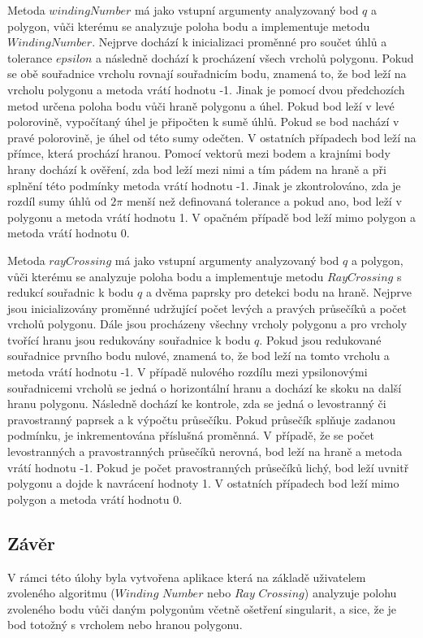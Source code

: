 \documentclass[15pt]{article}
\begin{document}
\begin{spacing}{1.5}
\noindent Metoda $windingNumber$ má jako vstupní argumenty analyzovaný bod $q$ a polygon, vůči kterému se analyzuje poloha bodu a implementuje metodu $Winding Number$. Nejprve dochází k inicializaci proměnné pro součet úhlů a tolerance $epsilon$ a následně dochází k procházení všech vrcholů polygonu. Pokud se obě souřadnice vrcholu rovnají souřadnicím bodu, znamená to, že bod leží na vrcholu polygonu a metoda vrátí hodnotu -1. Jinak je pomocí dvou předchozích metod určena poloha bodu vůči hraně polygonu a úhel. Pokud bod leží v levé polorovině, vypočítaný úhel je připočten k sumě úhlů. Pokud se bod nachází v pravé polorovině, je úhel od této sumy odečten. V ostatních případech bod leží na přímce, která prochází hranou. Pomocí vektorů mezi bodem a krajními body hrany dochází k ověření, zda bod leží mezi nimi a tím pádem na hraně a při splnění této podmínky metoda vrátí hodnotu -1. Jinak je zkontrolováno, zda je rozdíl sumy úhlů od $2\pi$ menší než definovaná tolerance a pokud ano, bod leží v polygonu a metoda vrátí hodnotu 1. V opačném případě bod leží mimo polygon a metoda vrátí hodnotu 0.

\noindent Metoda $rayCrossing$ má jako vstupní argumenty analyzovaný bod $q$ a polygon, vůči kterému se analyzuje poloha bodu a implementuje metodu $Ray Crossing$ s redukcí souřadnic k bodu $q$ a dvěma paprsky pro detekci bodu na hraně. Nejprve jsou inicializovány proměnné udržující počet levých a pravých průsečíků a počet vrcholů polygonu. Dále jsou procházeny všechny vrcholy polygonu a pro vrcholy tvořící hranu jsou redukovány souřadnice k bodu $q$. Pokud jsou redukované souřadnice prvního bodu nulové, znamená to, že bod leží na tomto vrcholu a metoda vrátí hodnotu -1. V případě nulového rozdílu mezi ypsilonovými souřadnicemi vrcholů se jedná o horizontální hranu a dochází ke skoku na další hranu polygonu. Následně dochází ke kontrole, zda se jedná o levostranný či pravostranný paprsek a k výpočtu průsečíku. Pokud průsečík splňuje zadanou podmínku, je inkrementována příslušná proměnná. V případě, že se počet levostranných a pravostranných průsečíků nerovná, bod leží na hraně a metoda vrátí hodnotu -1. Pokud je počet pravostranných průsečíků lichý, bod leží uvnitř polygonu a dojde k navrácení hodnoty 1. V ostatních případech bod leží mimo polygon a metoda vrátí hodnotu 0.

\subsection*{Závěr}
V rámci této úlohy byla vytvořena aplikace která na základě uživatelem zvoleného algoritmu ($Winding$ $Number$ nebo $Ray$ $Crossing$) analyzuje polohu zvoleného bodu vůči daným polygonům včetně ošetření singularit, a sice, že je bod totožný s vrcholem nebo hranou polygonu. 


\end{spacing}
\end{document}
